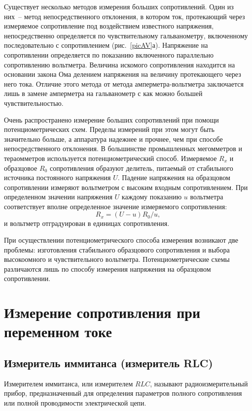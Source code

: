 \documentclass[pscyr,titlepage]{hedreport}
\newcommand{\Pic}[1]{\ref{pic#1}}
\newcommand{\pic}[1]{рис.~\Pic{#1}}
\begin{document}
  Существует несколько методов измерения больших сопротивлений. Один из них~--
  метод непосредственного отклонения, в котором ток, протекающий через
  измеряемое сопротивление под воздействием известного напряжения,
  непосредственно определяется по чувствительному гальванометру, включенному
  последовательно с сопротивлением (\pic{AV}а). Напряжение на сопротивлении
  определяется по показанию включенного параллельно сопротивлению вольтметра.
  Величина искомого сопротивления находится на основании закона Ома делением
  напряжения на величину протекающего через него тока. Отличие этого метода от
  метода амперметра-вольтметра заключается лишь в замене амперметра на
  гальванометр с как можно большей чувствительностью.
  
  \bigskip

  Очень распространено измерение больших сопротивлений при помощи
  потенциометрических схем. Пределы измерений при этом могут быть значительно
  больше, а аппаратура надежнее и прочнее, чем при способе непосредственного
  отклонения. В большинстве промышленных мегомметров и тераомметров используется
  потенциометрический способ. Измеряемое \( R_x \) и образцовое \( R_0 \)
  сопротивления образуют делитель, питаемый от стабильного источника постоянного
  напряжения \( U \). Падение напряжения на образцовом сопротивлении измеряют
  вольтметром с высоким входным сопротивлением. При определенном значении
  напряжения \( U \) каждому показанию \( u \) вольтметра соответствует вполне
  определенное значение измеряемого сопротивления:
  \[
    R_x = (U - u) R_0 / u,
  \]
  и вольтметр отградуирован в единицах сопротивления.
  
  При осуществлении потенциометрического способа измерения возникают две
  проблемы: изготовления стабильного образцового сопротивления и выбора
  высокоомного и чувствительного вольтметра. Потенциометрические схемы
  различаются лишь по способу измерения напряжения на образцовом сопротивлении.

  \section{Измерение сопротивления при переменном токе}
  
  \subsection[Измеритель иммитанса]{Измеритель иммитанса (измеритель RLC)}
  
  Измерителем иммитанса, или измерителем \( RLC \), называют радиоизмерительный
  прибор, предназначенный для определения параметров полного сопротивления или
  полной проводимости электрической цепи.
  
\end{document}
